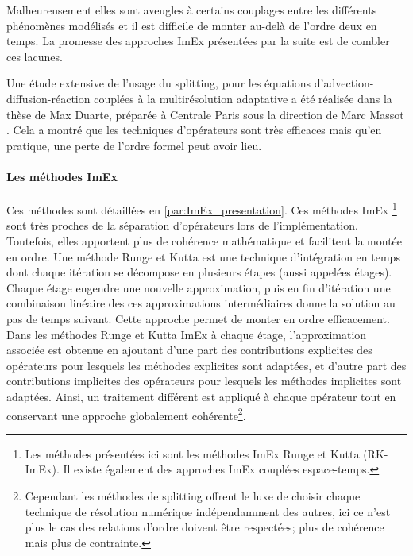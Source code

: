             Malheureusement elles sont aveugles à certains couplages entre les différents phénomènes modélisés et il est difficile de monter au-delà de l'ordre deux en temps. La promesse des
            approches ImEx présentées par la suite est de combler ces lacunes.\par
            Une étude extensive de l'usage du splitting, pour les équations d'advection-diffusion-réaction couplées à la multirésolution adaptative 
            a été réalisée dans la thèse de Max Duarte, préparée à Centrale Paris sous la direction de Marc Massot \cite{duart2011}.
            Cela a montré que les techniques d'opérateurs sont très efficaces mais qu'en pratique, une perte de l'ordre formel peut avoir lieu.

        \paragraph{Les méthodes ImEx}
            Ces méthodes sont détaillées en \ref{par:ImEx_presentation}. Ces méthodes ImEx
            \footnote{Les méthodes présentées ici sont les méthodes ImEx Runge et Kutta (RK-ImEx). Il existe également des approches ImEx couplées espace-temps\cite{rebou2024}.}  \cite{pareschi2010implicitexplicitrungekuttaschemesapplications} \cite{KENNEDY2003139}
            sont très proches de la séparation d'opérateurs lors de l'implémentation. Toutefois, elles apportent plus de cohérence mathématique
            et facilitent la montée en ordre. 
            Une méthode Runge et Kutta est une technique d'intégration en temps dont chaque itération se décompose en plusieurs étapes (aussi appelées étages).
            Chaque étage engendre une nouvelle approximation, puis en fin d'itération une combinaison linéaire des ces approximations intermédiaires donne la solution au pas de temps suivant.
            Cette approche permet de monter en ordre efficacement.
            Dans les méthodes Runge et Kutta ImEx à chaque étage, l'approximation associée est obtenue en ajoutant d'une part des contributions explicites des opérateurs pour lesquels les méthodes explicites sont adaptées,
            et d'autre part des contributions implicites des opérateurs pour lesquels les méthodes implicites sont adaptées.
            Ainsi, un traitement différent est appliqué à chaque opérateur tout en conservant une approche globalement cohérente\footnote{Cependant les méthodes de splitting 
            offrent le luxe de choisir chaque technique de résolution numérique indépendamment des autres, ici ce n'est plus le cas des relations d'ordre doivent être respectées;
            plus de cohérence mais plus de contrainte.}.

